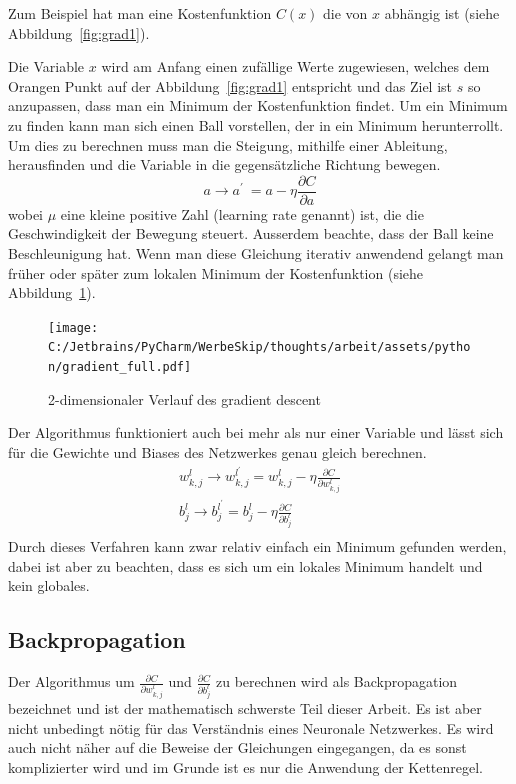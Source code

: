 \documentclass[12pt,a4paper]{report}
\begin{document}
Zum Beispiel hat man eine Kostenfunktion $C(x)$ die von $x$ abhängig ist (siehe Abbildung~\ref{fig:grad1}).

Die Variable $x$ wird am Anfang einen zufällige Werte zugewiesen,
welches dem Orangen Punkt auf der Abbildung~\ref{fig:grad1} entspricht und das Ziel ist $s$ so anzupassen,
dass man ein Minimum der Kostenfunktion findet.
Um ein Minimum zu finden kann man sich einen Ball vorstellen, der in ein Minimum herunterrollt.
Um dies zu berechnen muss man die Steigung, mithilfe einer Ableitung, herausfinden und die Variable in die
gegensätzliche Richtung bewegen.
\[a \rightarrow a^\prime\ = a - \eta\frac{\partial C}{\partial a}\]
wobei $\mu$ eine kleine positive Zahl (learning rate genannt) ist, die die Geschwindigkeit der Bewegung steuert.
Ausserdem beachte, dass der Ball keine Beschleunigung hat.
Wenn man diese Gleichung iterativ anwendend gelangt man früher oder später zum lokalen Minimum der Kostenfunktion (siehe Abbildung~\ref{fig:grad2}).

\begin{figure}[h]%
    \centering
    \texttt{[image: C:/Jetbrains/PyCharm/WerbeSkip/thoughts/arbeit/assets/python/gradient\_full.pdf]} %
    \caption{2-dimensionaler Verlauf des gradient descent}%
    \label{fig:grad2}%
\end{figure}

Der Algorithmus funktioniert auch bei mehr als nur einer Variable und lässt sich für die Gewichte und Biases des Netzwerkes genau gleich berechnen.
\begin{gather*}
    w^l_{k,j} \rightarrow w^{l^\prime}_{k,j} = w^l_{k,j} - \eta\frac{\partial C}{\partial w^l_{k,j}}\\
    b^l_j \rightarrow b^{l^\prime}_j = b^l_j - \eta\frac{\partial C}{\partial b^l_j}\\
\end{gather*}
Durch dieses Verfahren kann zwar relativ einfach ein Minimum gefunden werden, dabei ist aber zu beachten, dass es sich um ein lokales
Minimum handelt und kein globales.

\subsection{Backpropagation}
Der Algorithmus um $\frac{\partial C}{\partial w^l_{k,j}}$ und $\frac{\partial C}{\partial b^l_j}$ zu berechnen wird als
Backpropagation bezeichnet und ist der mathematisch schwerste Teil dieser Arbeit.
Es ist aber nicht unbedingt nötig für das Verständnis eines Neuronale Netzwerkes.
Es wird auch nicht näher auf die Beweise der Gleichungen eingegangen,
da es sonst komplizierter wird und im Grunde ist es nur die Anwendung der Kettenregel.
\end{document}
